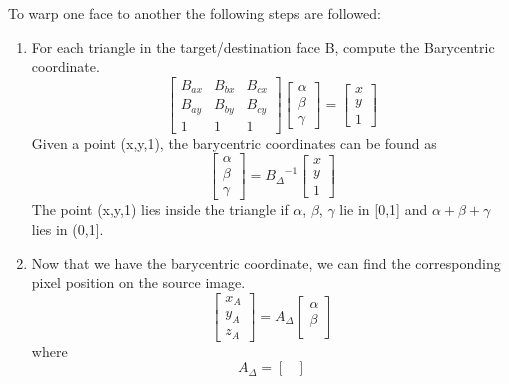 \documentclass[conference]{IEEEtran}
\begin{document}
To warp one face to another the following steps are followed:
\begin{enumerate}
\item For each triangle in the target/destination face B, compute the Barycentric coordinate.
\begin{equation}
\begin{bmatrix}
B_{ax} & B_{bx} & B_{cx} \\
B_{ay} & B_{by} & B_{cy} \\
1 &1 &1
\end{bmatrix}
\begin{bmatrix}
\alpha \\
\beta \\
\gamma
\end{bmatrix}
= 
\begin{bmatrix}
x\\
y\\
1
\end{bmatrix}
\end{equation}
Given a point (x,y,1), the barycentric coordinates can be found as
\begin{equation}
\begin{bmatrix}
\alpha\\
\beta\\
\gamma
\end{bmatrix}
=
{B_{\Delta}}^{-1}
\begin{bmatrix}
x\\
y\\1
\end{bmatrix}
\end{equation} 
The point (x,y,1) lies inside the triangle if $\alpha$, $\beta$, $\gamma$ lie in [0,1] and $\alpha + \beta + \gamma$ lies in (0,1].
\item Now that we have the barycentric coordinate, we can find the corresponding pixel position on the source image.
\begin{equation}
\begin{bmatrix}
x_{A}\\
y_{A}\\
z_{A}
\end{bmatrix}
= 
A_{\Delta}
\begin{bmatrix}
\alpha\\
\beta\\
\end{bmatrix}
\end{equation}
where
\begin{equation}
A_{\Delta} = 
\begin{bmatrix}

\end{bmatrix}
\end{equation}
\end{enumerate}
\end{document}
